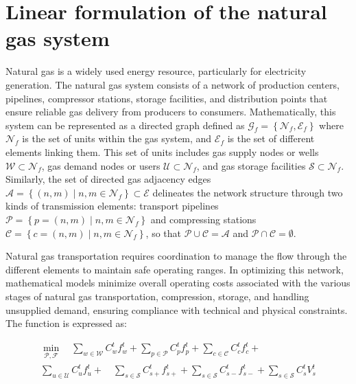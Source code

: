 \section{Linear formulation of the natural gas system} \label{sec:LinealCensnet_formulation}


Natural gas is a widely used energy resource, particularly for electricity generation. The natural gas system consists of a network of production centers, pipelines, compressor stations, storage facilities, and distribution points that ensure reliable gas delivery from producers to consumers. Mathematically, this system can be represented as a directed graph defined as $\mathcal{G}_f = \left\{\mathcal{N}_f, \mathcal{E}_f\right\}$ where $\mathcal{N}_f$ is the set of units within the gas system, and $ \mathcal{E}_f$ is the set of different elements linking them. This set of units includes gas supply nodes or wells $\mathcal{W} \subset \mathcal{N}_{f}$, gas demand nodes or users $\mathcal{U} \subset \mathcal{N}_{f}$, and gas storage facilities $\mathcal{S} \subset \mathcal{N}_{f}$. Similarly, the set of directed gas adjacency edges $\mathcal{A} = \left\{(n,m) \mid n,m\in\mathcal{N}_f \right\} \subset \mathcal{E}$ delineates the network structure through two kinds of transmission elements: transport pipelines $\mathcal{P} = \left\{p=(n,m) \mid n,m\in\mathcal{N}_f \right\}$ and compressing stations $\mathcal{C} = \left\{c=(n,m) \mid n,m\in\mathcal{N}_f \right\}$, so that $\mathcal{P}\cup\mathcal{C}=\mathcal{A}$ and $\mathcal{P}\cap\mathcal{C}=\emptyset$.


Natural gas transportation requires coordination to manage the flow through the different elements to maintain safe operating ranges. In optimizing this network, mathematical models minimize overall operating costs associated with the various stages of natural gas transportation, compression, storage, and handling unsupplied demand, ensuring compliance with technical and physical constraints. The function is expressed as:

\begin{equation} \label{eq:obj_func_integrated}
\begin{split}
\min_{\mathcal{P}, \mathcal{F}} \quad  \sum_{w \in \mathcal{W}} C_{w}^t {f_{w}^t} + \sum_{p \in \mathcal{P}} C_{p}^t {f_{p}^t} + \sum_{c \in \mathcal{C}} C_{c}^t {f_{c}^t} + \\ \sum_{u \in \mathcal{U}} C_{u}^{t} {f_{u}^{t}} + \quad \sum_{s \in \mathcal{S}} C_{s+}^{t} {f_{s+}^{t}}  + \sum_{s \in \mathcal{S}} C_{s-}^{t} {f_{s-}^{t}} + \sum_{s \in \mathcal{S}} C_{s}^{t} {V_{s}^{t}}
\end{split}
\end{equation}

